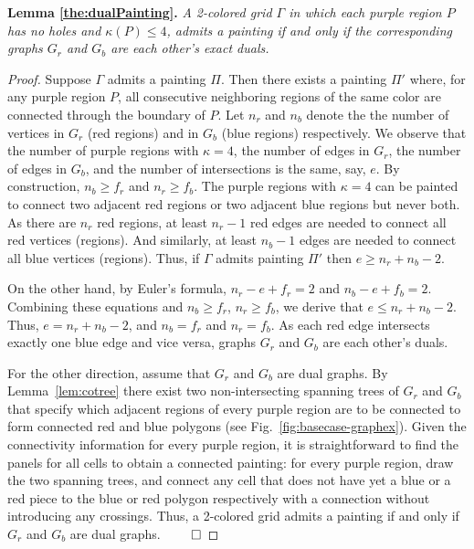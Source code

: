 \documentclass[runningheads]{llncs}
\newcommand{\cloneclaim}[2]{\medskip\noindent\textbf{#1.} \emph{#2}\smallskip}
\begin{document}
\cloneclaim{Lemma \ref{the:dualPainting}}{A 2-colored grid $\Gamma$ in which each purple region $P$ has no holes and $\kappa(P)\leq 4$, admits a painting if and only if the corresponding graphs $G_r$ and $G_b$ are each other's exact duals.}
\begin{proof}
Suppose $\Gamma$ admits a painting $\Pi$. Then there exists a painting $\Pi'$ where, for any purple region $P$, all consecutive neighboring regions of the same color are connected through the boundary of $P$.
Let $n_r$ and $n_b$ denote the the number of vertices in $G_r$ (red regions) and in $G_b$ (blue regions) respectively.
We observe that the number of purple regions with $\kappa=4$, the number of edges in $G_r$, the number of edges in $G_b$, and the number of intersections is the same, say, $e$.
By construction, $n_b\geq f_r$ and $n_r\geq f_b$.
The purple regions with $\kappa=4$ can be painted to connect two adjacent red regions or two adjacent blue regions but never both.
As there are $n_r$ red regions, at least $n_r-1$ red edges are needed to connect all red vertices (regions). And similarly, at least $n_b-1$ edges are needed to connect all blue vertices (regions). Thus, if $\Gamma$ admits painting $\Pi'$ then $e\geq n_r+n_b-2$.

On the other hand, by Euler's formula, $n_r-e+f_r=2$ and $n_b-e+f_b=2$. Combining these equations and $n_b\geq f_r$, $n_r\geq f_b$, we derive that $e \leq n_r+n_b-2$. Thus, $e = n_r+n_b-2$, and $n_b=f_r$ and $n_r=f_b$. As each red edge intersects exactly one blue edge and vice versa, graphs $G_r$ and $G_b$ are each other's duals.

For the other direction, assume that $G_r$ and $G_b$ are dual graphs. By Lemma~\ref{lem:cotree} there exist two non-intersecting spanning trees of $G_r$ and $G_b$ that specify which adjacent regions of every purple region are to be connected to form connected red and blue polygons (see Fig.~\ref{fig:basecase-graphex}). Given the connectivity information for every purple region, it is straightforward to find the panels for all cells to obtain a connected painting: for every purple region, draw the two spanning trees, and connect any cell that does not have yet a blue or a red piece to the blue or red polygon respectively with a connection without introducing any crossings.
Thus, a 2-colored grid admits a painting if and only if $G_r$ and $G_b$ are dual graphs.
\hfill$\qed$
\end{proof}
\end{document}
